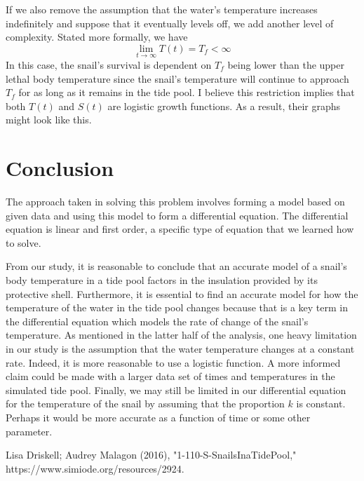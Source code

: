 \documentclass{article}
\begin{document}
   If we also remove the assumption that the water's temperature increases indefinitely and suppose that it eventually levels off, we add another level of complexity.
   Stated more formally, we have
   \begin{equation*}
     \lim_{t \to \infty} T(t) = T_{f} < \infty
   \end{equation*}
   In this case, the snail's survival is dependent on \(T_{f}\) being lower than the upper lethal body temperature since the snail's temperature will continue to approach \(T_{f}\) for as long as it remains in the tide pool.
   I believe this restriction implies that both \(T(t)\) and \(S(t)\) are logistic growth functions.
   As a result, their graphs might look like this.
   \begin{center}
   \end{center}

   \section{Conclusion}
   The approach taken in solving this problem involves forming a model based on given data and using this model to form a differential equation.
   The differential equation is linear and first order, a specific type of equation that we learned how to solve.

   From our study, it is reasonable to conclude that an accurate model of a snail's body temperature in a tide pool factors in the insulation provided by its protective shell.
   Furthermore, it is essential to find an accurate model for how the temperature of the water in the tide pool changes because that is a key term in the differential equation which models the rate of change of the snail's temperature.
   As mentioned in the latter half of the analysis, one heavy limitation in our study is the assumption that the water temperature changes at a constant rate.
   Indeed, it is more reasonable to use a logistic function.
   A more informed claim could be made with a larger data set of times and temperatures in the simulated tide pool.
   Finally, we may still be limited in our differential equation for the temperature of the snail by assuming that the proportion \(k\) is constant.
   Perhaps it would be more accurate as a function of time or some other parameter.



   \begin{thebibliography}{999}
      Lisa Driskell; Audrey Malagon (2016), "1-110-S-SnailsInaTidePool,"
      https://www.simiode.org/resources/2924.
   \end{thebibliography}
\end{document}
